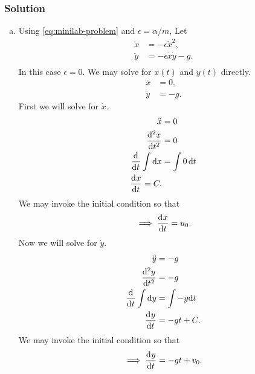\documentclass[12pt,twoside]{article}
\begin{document}
\subsubsection*{Solution}
\begin{enumerate}[(a)]
\item Using \cref{eq:minilab-problem} and $\epsilon=\alpha/m$, Let
  \begin{equation}
    \label{eq:minilab-1-let}
    \begin{aligned}
      \ddot{x} &= -\epsilon\dot{x}^2, \\
      \ddot{y} &= -\epsilon\dot{x}\dot{y}-g. \\
    \end{aligned}
  \end{equation}
  In this case $\epsilon = 0$. We may solve for $x(t)$ and $y(t)$ directly.
  \begin{equation*}
    \begin{aligned}
      \ddot{x} &= 0, \\
      \ddot{y} &= -g.
    \end{aligned}
  \end{equation*}
  First we will solve for $\dot{x}$.
  \begin{equation*}
    \begin{aligned}
      \ddot{x} &= 0 \\
      \od[2]{x}{t} &= 0 \\
      \od{}{t}\int\dd{x} &= \int 0\, \dd{t} \\
      \od{x}{t} = C. \\
    \end{aligned}
  \end{equation*}
  We may invoke the initial condition so that
  \begin{equation*}
    \implies\od{x}{t} = u_0.
  \end{equation*}
  Now we will solve for $\dot{y}$.
  \begin{equation*}
    \begin{aligned}
      \ddot{y} &= -g \\
      \od[2]{y}{t} &= -g \\
      \od{}{t}\int\dd{y} &= \int-g\dd{t} \\
      \od{y}{t} &= -gt + C. \\
    \end{aligned}
  \end{equation*}
  We may invoke the initial condition so that
  \begin{equation*}
    \implies \od{y}{t} = -gt + v_0.

\end{equation*}
\end{enumerate}
\end{document}
